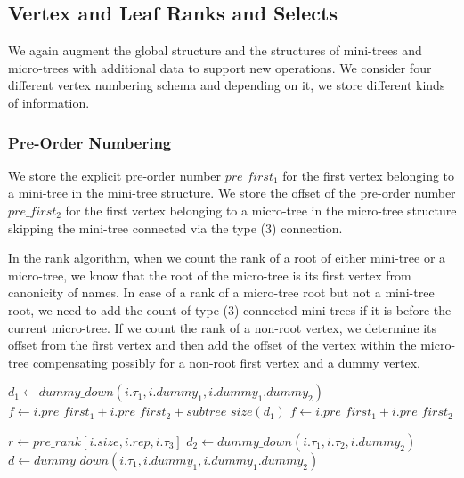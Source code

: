 \subsection{Vertex and Leaf Ranks and Selects}

We again augment the global structure and the structures of mini-trees and micro-trees with additional data to support new operations.
We consider four different vertex numbering schema and depending on it, we store different kinds of information.

\subsubsection{Pre-Order Numbering}

We store the explicit pre-order number $pre\_first_1$ for the first vertex belonging to a mini-tree in the mini-tree structure.
We store the offset of the pre-order number $pre\_first_2$ for the first vertex belonging to a micro-tree in the micro-tree structure skipping the mini-tree connected via the type (3) connection.

In the rank algorithm, when we count the rank of a root of either mini-tree or a micro-tree, we know that the root of the micro-tree is its first vertex from canonicity of names.
In case of a rank of a micro-tree root but not a mini-tree root, we need to add the count of type (3) connected mini-trees if it is before the current micro-tree.
If we count the rank of a non-root vertex, we determine its offset from the first vertex and then add the offset of the vertex within the micro-tree compensating possibly for a non-root first vertex and a dummy vertex.

\begin{algorithmic}
			\State $d_1 \gets dummy\_down(i.\tau_1, i.dummy_1, i.dummy_1.dummy_2)$
			\State $f \gets i.pre\_first_1 + i.pre\_first_2 + subtree\_size(d_1)$
		\Else
			\State $f \gets i.pre\_first_1 + i.pre\_first_2$
		\EndIf
		
		\State $r \gets pre\_rank[i.size, i.rep, i.\tau_3]$
			\State $d_2 \gets dummy\_down(i.\tau_1, i.\tau_2, i.dummy_2)$
			\State {}
		\Else
			\State {}
		\EndIf
			\State $d \gets dummy\_down(i.\tau_1, i.dummy_1, i.dummy_1.dummy_2)$
			\State {}
		\Else
			\State {}
		\EndIf
	\Else
		\State {}
	\EndIf
\EndFunction
\end{algorithmic}

